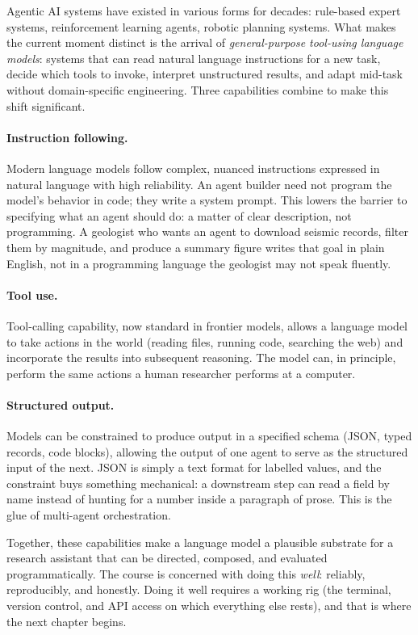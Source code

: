 Agentic AI systems have existed in various forms for decades: rule-based expert systems, reinforcement learning agents, robotic planning systems.
What makes the current moment distinct is the arrival of \emph{general-purpose tool-using language models}: systems that can read natural language instructions for a new task, decide which tools to invoke, interpret unstructured results, and adapt mid-task without domain-specific engineering.
Three capabilities combine to make this shift significant.

\paragraph{Instruction following.}
Modern language models follow complex, nuanced instructions expressed in natural language with high reliability.
An agent builder need not program the model's behavior in code; they write a system prompt.
This lowers the barrier to specifying what an agent should do: a matter of clear description, not programming.
A geologist who wants an agent to download seismic records, filter them by magnitude, and produce a summary figure writes that goal in plain English, not in a programming language the geologist may not speak fluently.

\paragraph{Tool use.}
Tool-calling capability, now standard in frontier models, allows a language model to take actions in the world (reading files, running code, searching the web) and incorporate the results into subsequent reasoning.
The model can, in principle, perform the same actions a human researcher performs at a computer.

\paragraph{Structured output.}
Models can be constrained to produce output in a specified schema (JSON, typed records, code blocks), allowing the output of one agent to serve as the structured input of the next.
JSON is simply a text format for labelled values, and the constraint buys something mechanical: a downstream step can read a field by name instead of hunting for a number inside a paragraph of prose.
This is the glue of multi-agent orchestration.

Together, these capabilities make a language model a plausible substrate for a research assistant that can be directed, composed, and evaluated programmatically.
The course is concerned with doing this \emph{well}: reliably, reproducibly, and honestly.
Doing it well requires a working rig (the terminal, version control, and API access on which everything else rests), and that is where the next chapter begins.

